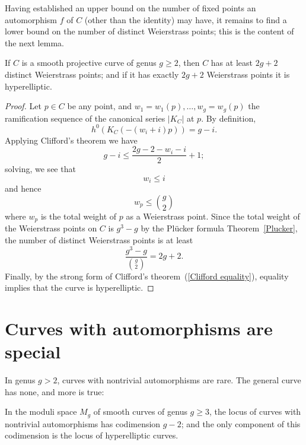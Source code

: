 Having established an upper  bound on the number of fixed points an automorphism $f$ of $C$ (other than the identity) may have, it remains to find a lower bound on the number of distinct Weierstrass points; this is the content of the next lemma.


\begin{lemma}
If $C$ is a smooth projective curve of genus $g \geq 2$, then $C$ has at least $2g+2$ distinct Weierstrass points; and if it has exactly $2g+2$ Weierstrass points it is hyperelliptic.
\end{lemma}

\begin{proof}
Let $p \in C$ be any point, and $w_1=w_1(p),\dots,w_g = w_g(p)$ the ramification sequence of the canonical series $|K_C|$ at $p$. By definition, 
$$
h^0(K_C(-(w_i+i)p)) = g - i.
$$
Applying Clifford's theorem we have
$$
g-i \leq \frac{2g - 2 - w_i - i}{2} + 1;
$$
solving, we see that
$$
w_i \leq i
$$
and hence
$$
w_p \leq \binom{g}{2}
$$
where $w_p$ is the total weight of $p$ as a Weierstrass point. Since the total weight of the Weierstrass points on $C$ is $g^3-g$ by the Pl\"ucker formula Theorem~\ref{Plucker}, the number of distinct Weierstrass points is at least
$$
\frac{g^3-g}{\binom{g}{2}} = 2g+2.
$$
Finally, by the strong form of Clifford's theorem~(\ref{Clifford equality}), equality implies that the curve is hyperelliptic.
\end{proof}

\section{Curves with automorphisms are special}\label{curves with automorphisms}

In genus $g > 2$, curves with nontrivial automorphisms are rare. The general curve has none, and more is true:

\begin{lemma}
In the moduli space $M_g$ of smooth curves of genus $g \geq 3$, the locus of curves with nontrivial automorphisms has codimension $g-2$; and the only component of this codimension is the locus
of hyperelliptic curves.
\end{lemma}

